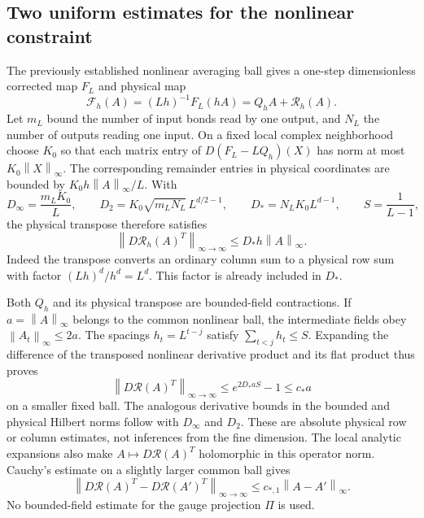 \documentclass[11pt]{article}
\theoremstyle{remark}
\newcommand{\norm}[1]{\left\|#1\right\|}
\begin{document}
\subsection{Two uniform estimates for the nonlinear constraint}
\label{nm-average-estimates}

The previously established nonlinear averaging ball gives a
one-step dimensionless corrected map $F_L$ and physical map
\begin{equation}\label{nm-one-step}
 \mathcal F_h(A)=(Lh)^{-1}F_L(hA)=Q_hA+\mathcal R_h(A).
\end{equation}
Let $m_L$ bound the number of input bonds read by one output, and
$N_L$ the number of outputs reading one input. On a fixed local
complex neighborhood choose $K_0$ so that each matrix entry of
$D(F_L-LQ_h)(X)$ has norm at most $K_0\norm{X}_\infty$.
The corresponding remainder entries in physical coordinates are
bounded by $K_0h\norm{A}_\infty/L$. With
\begin{equation}\label{nm-local-constants}
 D_\infty=\frac{m_LK_0}{L},\qquad
 D_2=K_0\sqrt{m_LN_L}\,L^{d/2-1},\qquad
 D_*=N_LK_0L^{d-1},\qquad S=\frac1{L-1},
\end{equation}
the physical transpose therefore satisfies
\begin{equation}\label{nm-adjoint-one-step}
 \norm{D\mathcal R_h(A)^T}_{\infty\to\infty}
 \le D_*h\norm{A}_\infty.
\end{equation}
Indeed the transpose converts an ordinary column sum to a physical
row sum with factor $(Lh)^d/h^d=L^d$. This factor is already
included in $D_*$.

Both $Q_h$ and its physical transpose are bounded-field
contractions. If $a=\norm{A}_\infty$ belongs to the common nonlinear
ball, the intermediate fields obey $\norm{A_t}_\infty\le2a$.
The spacings $h_t=L^{t-j}$ satisfy $\sum_{t<j}h_t\le S$.
Expanding the difference of the transposed nonlinear derivative
product and its flat product thus proves
\begin{equation}\label{nm-adjoint-composite}
 \norm{D\mathcal R(A)^T}_{\infty\to\infty}
 \le e^{2D_*aS}-1\le c_*a
\end{equation}
on a smaller fixed ball. The analogous derivative bounds in the
bounded and physical Hilbert norms follow with $D_\infty$ and
$D_2$. These are absolute physical row or column estimates, not
inferences from the fine dimension. The local analytic expansions
also make $A\mapsto D\mathcal R(A)^T$ holomorphic in this operator
norm. Cauchy's estimate on a slightly larger common ball gives
\begin{equation}\label{nm-adjoint-lipschitz}
 \norm{D\mathcal R(A)^T-D\mathcal R(A')^T}_{\infty\to\infty}
 \le c_{*,1}\norm{A-A'}_\infty.
\end{equation}
No bounded-field estimate for the gauge projection $\Pi$ is used.
\end{document}
